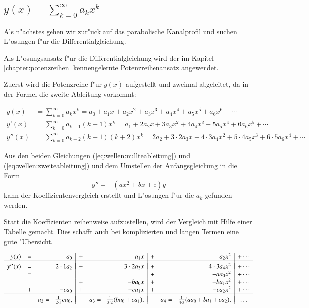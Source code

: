 \subsection{\texorpdfstring{$y(x) = \sum_{k = 0}^{\infty} a_{k}x^k$}{y(x) = 
summe k = 0 bis unendlich ak xk}}
\label{subsec:wellen:Potenzreihenansatz}

Als n"achstes gehen wir zur"uck auf das parabolische Kanalprofil und suchen 
L"osungen f"ur die Differentialgleichung.

Als L"osungsansatz f"ur die Differentialgleichung wird der im Kapitel 
\ref{chapter:potenzreihen} kennengelernte Potenzreihenansatz angewendet.

Zuerst wird die Potenzreihe f"ur $y(x)$ aufgestellt und zweimal abgeleitet, da 
in der Formel die zweite Ableitung vorkommt:

\begin{align*}
	y(x)
	&=
	\sum_{k = 0}^{\infty} a_{k}x^k
	=
	a_0 + a_1x + a_2x^2 + a_3x^3 + a_4x^4 + a_5x^5 + a_6x^6 + \dotsb
	\\
	y'(x)
	&=
	\sum_{k=0}^{\infty} a_{k+1}(k+1)x^k
	=
	a_1 + 2a_2x + 3a_3x^2 + 4a_4x^3 + 5a_5x^4 + 6a_6x^5+ \dotsb
	\\
	y''(x)
	&=
	\sum_{k = 0}^{\infty} a_{k+2}(k+1)(k+2)x^k
	=
	2a_2 + 3 \mathbin{\cdot} 2a_3x + 4 \mathbin{\cdot} 3a_4x^2 + 5 
	\mathbin{\cdot} 4a_5x^3 + 6 \mathbin{\cdot} 5a_6x^4 + \dotsb
\end{align*}
 
Aus den beiden Gleichungen (\ref{eq:wellen:nullteableitung}) und
(\ref{eq:wellen:zweiteableitung}) und dem Umstellen der Anfangsgleichung in die 
Form
\begin{equation*}
	y'' = -(ax^2+bx+c)y
\end{equation*}
kann der Koeffizientenvergleich erstellt und L"osungen f"ur die $a_k$ gefunden 
werden. 

Statt die Koeffizienten reihenweise aufzustellen, wird der Vergleich 
mit Hilfe einer Tabelle gemacht. Dies schafft auch bei komplizierten und langen 
Termen eine gute "Ubersicht.

\begin{equation}
	\begin{array}{r c r | c r | c r | c r c}
	y(x) & = &
	a_0 & + & a_1x & + & a_2x^2 & + \dotsb
	\\
	\hline&&&&&&&\\[-2ex]
	y''(x) & = &
	2\cdot1 a_2 & + & 3\cdot2 a_3x & + & 4\cdot3 a_4x^2 & + \dotsb
	\\
	& = &
	& & & + &- aa_0x^2 & + \dotsb
	\\
	& &
	& + &- ba_0x & + &- ba_1x^2 & + \dotsb
	\\
	& + &
	-ca_0 & + &- ca_1x & + &- ca_2x^2 & + \dotsb
	\\
	\hline&&&&&&&\\[-2ex]
	& &
	a_2 = -\frac{1}{2 \cdot 1}ca_0,
	& & a_3 = -\frac{1}{3 \cdot 2}(ba_0+ca_1),
	& & a_4 = -\frac{1}{4 \cdot 3}(aa_0+ba_1+ca_2),
	& \dots
	\end{array}
	\label{eq:wellen:koeffizietenvergleichtabelle}
\end{equation}

